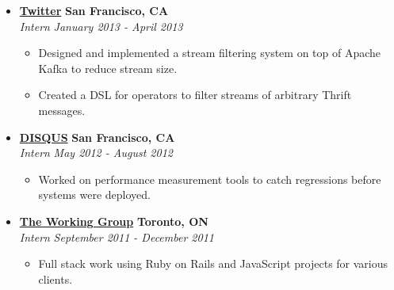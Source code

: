 \documentclass[10pt,letterpaper]{article}
\begin{document}
\begin{itemize}[leftmargin=*]
    \item[]
    {\href{http://www.twitter.com}{\textbf{Twitter}} \hfill
      \textbf{San Francisco, CA}}
    \\
    {\emph{Intern} \hfill \emph{January 2013 - April 2013}}
    
    \begin{itemize}[label=\textbullet]
      \itemsep0em
      \item Designed and implemented a stream filtering system on top of Apache
      Kafka to reduce stream size.
      \item Created a DSL for operators to filter streams of arbitrary Thrift
      messages.
    \end{itemize}
    
    \item[]
    {\href{http://www.disqus.com}{\textbf{DISQUS}} \hfill
      \textbf{San Francisco, CA}}
    \\
    {\emph{Intern} \hfill \emph{May 2012 - August 2012}}
    
    \begin{itemize}[label=\textbullet]
      \itemsep0em
      \item Worked on performance measurement tools to catch regressions before
      systems were deployed.
    \end{itemize}
    
    
    \item[]
    {\href{http://www.twg.ca}{\textbf{The Working Group}} \hfill
      \textbf{Toronto, ON}}
    \\
    {\emph{Intern} \hfill \emph{September 2011 - December 2011}}
    
    \begin{itemize}[label=\textbullet]
      \itemsep0em
      \item Full stack work using Ruby on Rails and JavaScript projects for various
      clients.
    \end{itemize}
    

\end{itemize}
\end{document}
